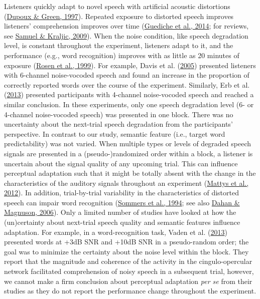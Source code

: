 \documentclass[a4paper, nobind]{templates/ociamthesis}
\begin{document}
Listeners quickly adapt to novel speech with artificial acoustic distortions (\protect\hyperlink{ref-Dupoux1997}{Dupoux \& Green, 1997}).
Repeated exposure to distorted speech improves listeners' comprehension improves over time (\protect\hyperlink{ref-Guediche2014}{Guediche et al., 2014}; for reviews, see \protect\hyperlink{ref-Samuel2009}{Samuel \& Kraljic, 2009}).
When the noise condition, like speech degradation level, is constant throughout the experiment, listeners adapt to it, and the performance (e.g., word recognition) improves with as little as 20 minutes of exposure (\protect\hyperlink{ref-Rosen1999}{Rosen et al., 1999}).
For example, Davis et al. (\protect\hyperlink{ref-Davis2005}{2005}) presented listeners with 6-channel noise-vocoded speech and found an increase in the proportion of correctly reported words over the course of the experiment.
Similarly, Erb et al. (\protect\hyperlink{ref-Erb2013}{2013}) presented participants with 4-channel noise-vocoded speech and reached a similar conclusion.
In these experiments, only one speech degradation level (6- or 4-channel noise-vocoded speech) was presented in one block.
There was no uncertainty about the next-trial speech degradation from the participants' perspective.
In contrast to our study, semantic feature (i.e., target word predictability) was not varied.
When multiple types or levels of degraded speech signals are presented in a (pseudo-)randomized order within a block, a listener is uncertain about the signal quality of any upcoming trial.
This can influence perceptual adaptation such that
it might be totally absent with the change in the characteristics of the auditory signals throughout an experiment (\protect\hyperlink{ref-Mattys2012}{Mattys et al., 2012}).
In addition, trial-by-trial variability in the characteristics of distorted speech can impair word recognition (\protect\hyperlink{ref-Sommers1994}{Sommers et al., 1994}; see also \protect\hyperlink{ref-Dahan2006}{Dahan \& Magnuson, 2006}).
Only a limited number of studies have looked at how the (un)certainty about next-trial speech quality and semantic features influence adaptation.
For example, in a word-recognition task, Vaden et al. (\protect\hyperlink{ref-Vaden2013}{2013}) presented words at +3dB SNR and +10dB SNR in a pseudo-random order;
the goal was to minimize the certainty about the noise level within the block.
They report that the magnitude and coherence of the activity in the cingulo-opercular network facilitated comprehension of noisy speech in a subsequent trial,
however, we cannot make a firm conclusion about perceptual adaptation \emph{per se} from their studies as they do not report the performance change throughout the experiment.
\end{document}
